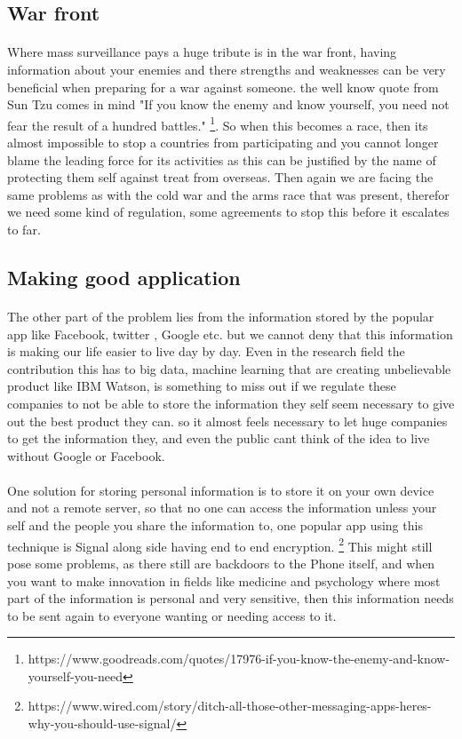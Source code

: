 \documentclass{article}
\begin{document}
\subsection{War front}
\paragraph{}
Where mass surveillance pays a huge tribute is in the war front, having information about your enemies and there strengths and weaknesses can be very beneficial when preparing for a war against someone. the well know quote from  Sun Tzu comes in mind "If you know the enemy and know yourself, you need not fear the result of a hundred battles." \footnote{https://www.goodreads.com/quotes/17976-if-you-know-the-enemy-and-know-yourself-you-need}. So when this becomes a race, then its almost impossible to stop a countries from participating and you cannot longer blame the leading force for its activities as this can be justified by the name of protecting them self against treat from overseas. Then again we are facing the same problems as with the cold war and the arms race that was present, therefor we need some kind of regulation, some agreements to stop this before it escalates to far.

\subsection{Making good application}
\paragraph{}
The other part of the problem lies from the information stored by the popular app like Facebook, twitter , Google etc. but we cannot deny that this information is making our life easier to live day by day. Even in the research field the contribution this has to big data, machine learning that are creating unbelievable product like IBM Watson, is something to miss out if we regulate these companies to not be able to store the information they self seem necessary to give out the best product they can. so it almost feels necessary to let huge companies to get the information they, and even the public cant think of the idea to live without Google or Facebook. 
\paragraph{}
One solution for storing personal information is to store it on your own device and not a remote server, so that no one can access the information unless your self and the people you share the information to, one popular app using this technique is Signal along side having end to end encryption. \footnote{https://www.wired.com/story/ditch-all-those-other-messaging-apps-heres-why-you-should-use-signal/} This might still pose some problems, as there still are backdoors to the Phone itself, and when you want to make innovation in fields like medicine and psychology where most part of the information is personal and very sensitive, then this information needs to be sent again to everyone wanting or needing access to it.
\end{document}
